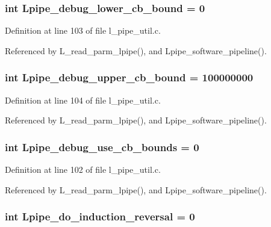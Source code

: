 \subsubsection{\setlength{\rightskip}{0pt plus 5cm}int \bf{Lpipe\_\-debug\_\-lower\_\-cb\_\-bound} = 0}\label{l__pipe__util_8c_4ebe475f1a840fbaa32b10d000fd7f70}




Definition at line 103 of file l\_\-pipe\_\-util.c.

Referenced by L\_\-read\_\-parm\_\-lpipe(), and Lpipe\_\-software\_\-pipeline().
\subsubsection{\setlength{\rightskip}{0pt plus 5cm}int \bf{Lpipe\_\-debug\_\-upper\_\-cb\_\-bound} = 100000000}\label{l__pipe__util_8c_9142d5510348648db05b36ee12f6058e}




Definition at line 104 of file l\_\-pipe\_\-util.c.

Referenced by L\_\-read\_\-parm\_\-lpipe(), and Lpipe\_\-software\_\-pipeline().
\subsubsection{\setlength{\rightskip}{0pt plus 5cm}int \bf{Lpipe\_\-debug\_\-use\_\-cb\_\-bounds} = 0}\label{l__pipe__util_8c_ab570eb13a3e6d913d45c8a3b85fad84}




Definition at line 102 of file l\_\-pipe\_\-util.c.

Referenced by L\_\-read\_\-parm\_\-lpipe(), and Lpipe\_\-software\_\-pipeline().
\subsubsection{\setlength{\rightskip}{0pt plus 5cm}int \bf{Lpipe\_\-do\_\-induction\_\-reversal} = 0}\label{l__pipe__util_8c_fe93aca3da93bf91019df7f7726355fb}




